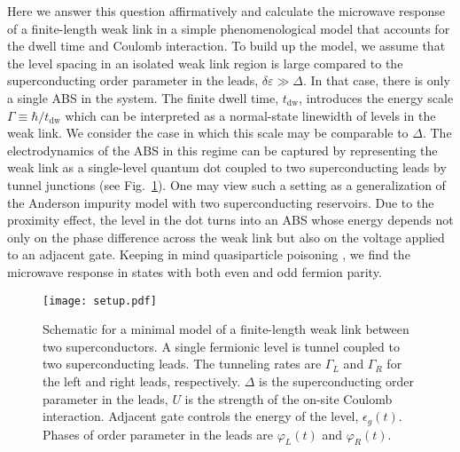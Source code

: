 \documentclass[aps,reprint,longbibliography, prb]{revtex4-2}
\begin{document}
Here we answer this question affirmatively and calculate the microwave response of a finite-length weak link in a simple phenomenological model that accounts for the dwell time and Coulomb interaction. To build up the model, we assume that the level spacing in an isolated weak link region is large compared to the superconducting order parameter in the leads, $\delta\varepsilon\gg\Delta$. In that case, there is only a single ABS in the system. The finite dwell time, $t_\mathrm{dw}$, introduces the energy scale $\Gamma\equiv \hbar/t_\mathrm{dw}$ which can be interpreted as a normal-state linewidth of levels in the weak link. We consider the case in which this scale may be comparable to $\Delta$. The electrodynamics of the ABS in this regime can be captured by representing the weak link as a single-level quantum dot coupled to two superconducting leads by tunnel junctions \cite{beenakker1992, yeyati2011} (see Fig.~\ref{fig:setup}). One may view such a setting as a generalization \cite{glazman1989}
of the Anderson impurity model \cite{anderson61} with two superconducting reservoirs.
Due to the proximity effect, the level in the dot turns into an ABS whose energy depends not only on the phase difference across the weak link but also on the voltage applied to an adjacent gate. Keeping in mind quasiparticle poisoning \cite{janvier2015, hays2018}, we find the microwave response in states with both even and odd fermion parity.

\begin{figure}[t]
  \begin{center}
    \texttt{[image: setup.pdf]}
    \caption{Schematic for a minimal model of a finite-length weak link between two superconductors. A single fermionic level is tunnel coupled to two superconducting leads. The tunneling rates are $\Gamma_L$ and $\Gamma_R$ for the left and right leads, respectively. $\Delta$ is the superconducting order parameter in the leads, $U$ is the strength of the on-site Coulomb interaction. Adjacent gate controls the energy of the level, $\epsilon_g(t)$. Phases of order parameter in the leads are $\varphi_L(t)$ and $\varphi_R(t)$.
    \label{fig:setup}}
  \end{center}
\end{figure}
\end{document}
